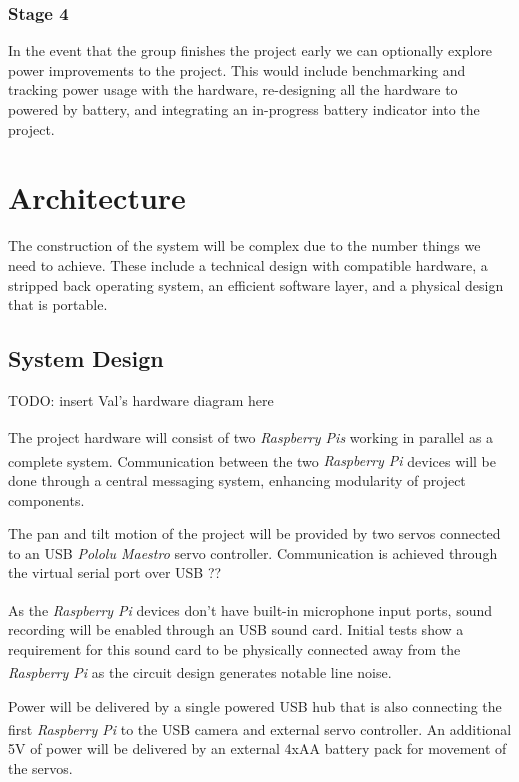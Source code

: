 \documentclass[11pt,a4paper,titlepage]{report}
\newcommand{\rpi}{\textit{Raspberry Pi\textsuperscript{\textregistered}}}
\newcommand{\rpis}{\textit{Raspberry Pi\textsuperscript{\textregistered}s}}
\begin{document}
\subsubsection{Stage 4}

In the event that the group finishes the project early we can optionally explore power improvements to the project. This would include benchmarking and tracking power usage with the hardware, re-designing all the hardware to powered by battery, and integrating an in-progress battery indicator into the project.



\section{Architecture}

The construction of the system will be complex due to the number things we need to achieve. These include a technical design with compatible hardware, a stripped back operating system, an efficient software layer, and a physical design that is portable.

\subsection{System Design}


{\color{red} TODO: insert Val's hardware diagram here}


The project hardware will consist of two \rpis\xspace working in parallel as a complete system. Communication between the two \rpi\xspace devices will be done through a central messaging system, enhancing modularity of project components.

The pan and tilt motion of the project will be provided by two servos connected to an USB \textit{Pololu Maestro} servo controller. {\color{red} Communication is achieved through the virtual serial port over USB ??}


As the \rpi\xspace devices don't have built-in microphone input ports, sound recording will be enabled through an USB sound card. Initial tests show a requirement for this sound card to be physically connected away from the \rpi\xspace as the circuit design generates notable line noise.

Power will be delivered by a single powered USB hub that is also connecting the first \rpi\xspace to the USB camera and external servo controller. An additional 5V of power will be delivered by an external 4xAA battery pack for movement of the servos.
\end{document}
